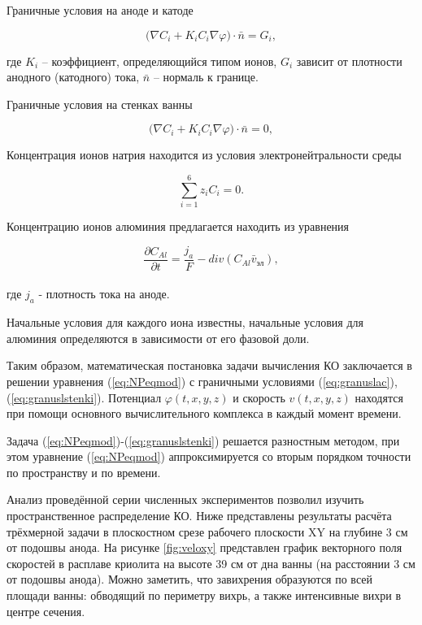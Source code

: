 \documentclass[]{pmi}
\def\phi{\varphi}
\begin{document}
Граничные условия на аноде и катоде

\begin{equation}\label{eq:granuslac}
\big(\nabla C_i + K_i C_i \nabla \phi \big) \cdot \bar{n} = G_i, 
\end{equation}

где $K_i$ – коэффициент, определяющийся типом ионов,  $G_i$ зависит от плотности анодного (катодного) тока, $\bar{n}$ – нормаль к границе.

Граничные условия на стенках ванны

\begin{equation}\label{eq:granuslstenki}
\big(\nabla C_i + K_i C_i \nabla \phi \big) \cdot \bar{n} = 0,
\end{equation}

Концентрация ионов натрия находится из условия электронейтральности среды

\[ \sum\limits_{i=1}^6 z_iC_i = 0. \]

Концентрацию ионов алюминия предлагается находить из уравнения 

\[ \frac{\partial C_{Al}}{\partial t} = \frac{j_a}{F} - div(C_{Al} \bar{v}_{\text{эл}}), \]
\\
где $j_a$ - плотность тока на аноде.

Начальные условия для каждого иона известны, начальные условия для алюминия определяются в зависимости от его фазовой доли. 

Таким образом, математическая постановка задачи вычисления КО заключается в решении уравнения (\ref{eq:NPeqmod}) с граничными условиями (\ref{eq:granuslac}), (\ref{eq:granuslstenki}). Потенциал $\phi(t,x,y,z)$ и скорость $v(t,x,y,z)$ находятся при помощи основного вычислительного комплекса в каждый момент времени.

Задача (\ref{eq:NPeqmod})-(\ref{eq:granuslstenki}) решается разностным методом, при этом уравнение (\ref{eq:NPeqmod}) аппроксимируется со вторым порядком точности по пространству и по времени.

Анализ проведённой серии численных экспериментов позволил изучить пространственное распределение КО. 
Ниже представлены результаты расчёта трёхмерной задачи в плоскостном срезе рабочего плоскости XY на глубине 3 см от подошвы анода. На рисунке \ref{fig:veloxy} представлен график векторного поля скоростей в расплаве криолита на высоте 39 см от дна ванны (на расстоянии 3 см от подошвы анода). Можно заметить, что завихрения образуются по всей площади ванны: обводящий по периметру вихрь, а также интенсивные вихри в центре сечения.
\end{document}
